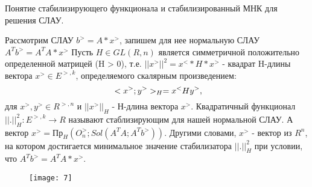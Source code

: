 \documentclass[__main__.tex]{subfiles}
\begin{document}
Понятие стабилизирующего функционала и стабилизированный МНК для решения СЛАУ.


\begin{definition}
	Рассмотрим СЛАУ $b^{>} = A * x^{>}$, запишем для нее нормальную СЛАУ  $A^{T}b^{>} = A^{T}A*x^{>}$
Пусть $H \in GL(R,n)$ является симметричной положительно определенной матрицей (H > 0), т.е. $||x^{>}||^2 = x^{<}*H*x^{>}$ - квадрат H-длины вектора $x^{>} \in E^{>,k}$, определяемого скалярным произведением:
\begin{equation}
\ <x^{>};y^{>}>_H = x^{<} H y^{>},
\llabel{eq:1}
\end{equation}
для $ x^{>},y^{>} \in R^{>,n}$ и $||x^{>}||_H$ - Н-длина вектора  $x^{>}$. Квадратичный функционал $||.||_{H}^{2} : E^{>,k} \rightarrow R$ называют стаблизирующим для нашей нормальной СЛАУ. А вектор $x^{>} = Пр_H (O^{>}_{n}; Sol(A^{T}A; A^{T}b^{>}))$. Другими словами, $x^{>}$ - вектор из $R^{n}$, на котором достигается минимальное значение стабилизатора $||.||_{H}^{2}$ при условии, что  $A^{T}b^{>} = A^{T}A*x^{>}$.
\end{definition}
\begin{figure}[h]
	\centering
	\texttt{[image: 7]}
	\caption{ }
\end{figure}
\end{document}
